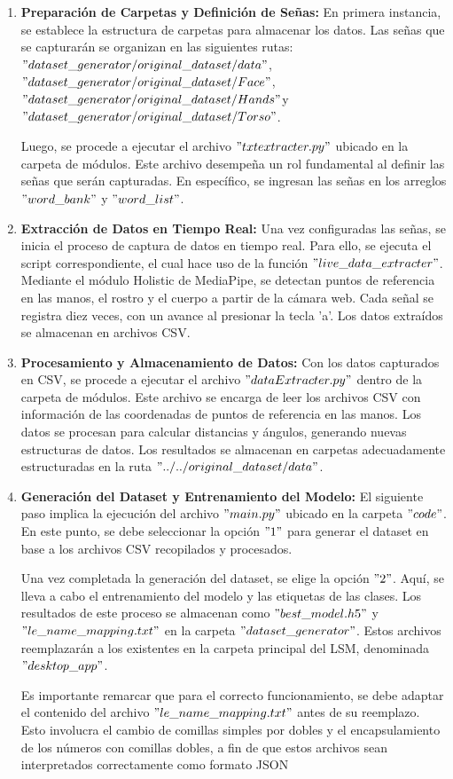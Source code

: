 \documentclass[conference]{IEEEtran}
\begin{document}
\begin{enumerate}
    \item \textbf{Preparación de Carpetas y Definición de Señas:} En primera instancia, se establece la estructura de carpetas para almacenar los datos. Las señas que se capturarán se organizan en las siguientes rutas: $"dataset\_generator/original\_dataset/data"$, $"dataset\_generator/original\_dataset/Face"$, $"dataset\_generator/original\_dataset/Hands" $y $"dataset\_generator/original\_dataset/Torso"$.

    Luego, se procede a ejecutar el archivo $"txtextracter.py"$ ubicado en la carpeta de módulos. Este archivo desempeña un rol fundamental al definir las señas que serán capturadas. En específico, se ingresan las señas en los arreglos $"word\_bank"$ y $"word\_list"$.

    \item \textbf{Extracción de Datos en Tiempo Real:} Una vez configuradas las señas, se inicia el proceso de captura de datos en tiempo real. Para ello, se ejecuta el script correspondiente, el cual hace uso de la función $"live\_data\_extracter"$. Mediante el módulo Holistic de MediaPipe, se detectan puntos de referencia en las manos, el rostro y el cuerpo a partir de la cámara web. Cada señal se registra diez veces, con un avance al presionar la tecla 'a'. Los datos extraídos se almacenan en archivos CSV.

    \item \textbf{Procesamiento y Almacenamiento de Datos:} Con los datos capturados en CSV, se procede a ejecutar el archivo $"dataExtracter.py"$ dentro de la carpeta de módulos. Este archivo se encarga de leer los archivos CSV con información de las coordenadas de puntos de referencia en las manos. Los datos se procesan para calcular distancias y ángulos, generando nuevas estructuras de datos. Los resultados se almacenan en carpetas adecuadamente estructuradas en la ruta $"../../original\_dataset/data"$.

    \item \textbf{Generación del Dataset y Entrenamiento del Modelo:} El siguiente paso implica la ejecución del archivo $"main.py"$ ubicado en la carpeta $"code"$. En este punto, se debe seleccionar la opción $"1"$ para generar el dataset en base a los archivos CSV recopilados y procesados.

    Una vez completada la generación del dataset, se elige la opción $"2"$. Aquí, se lleva a cabo el entrenamiento del modelo y las etiquetas de las clases. Los resultados de este proceso se almacenan como $"best\_model.h5"$ y $"le\_name\_mapping.txt"$ en la carpeta $"dataset\_generator"$. Estos archivos reemplazarán a los existentes en la carpeta principal del LSM, denominada $"desktop\_app"$.

    
    Es importante remarcar que para el correcto funcionamiento, se debe adaptar el contenido del archivo $"le\_name\_mapping.txt"$ antes de su reemplazo. Esto involucra el cambio de comillas simples por dobles y el encapsulamiento de los números con comillas dobles, a fin de que estos archivos sean interpretados correctamente como formato JSON
\end{enumerate}
\end{document}
